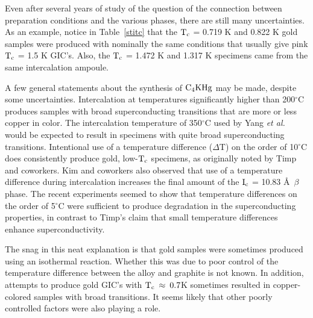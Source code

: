         Even after several years of study of the question of the connection
between preparation conditions and the various phases, there are still many
uncertainties.   As an example,  notice in Table~\ref{stitc}  that the $\rm
T_c$ =  0.719 K and 0.822  K gold samples were  produced with nominally the
same conditions that usually give pink $\rm T_c$ = 1.5  K GIC's.  Also, the
$\rm T_c$ = 1.472 K and 1.317 K specimens came from the  same intercalation
ampoule.

        A few general statements about the synthesis of $\rm C_4KHg$ may be
made,   despite    some   uncertainties.   Intercalation  at   temperatures
significantly  higher  than 200$^{\circ}$C produces   samples  with   broad
superconducting  transitions that are more  or  less copper  in color.  The
intercalation temperature  of    350$^{\circ}$C used   by   Yang  {\em   et
al.\/}\cite{yang88}  would be  expected  to result  in specimens with quite
broad  superconducting   transitions.   Intentional  use of a   temperature
difference  ($\Delta$T)  on the   order of  10$^{\circ}$C does consistently
produce gold,  low-$\rm T_c$  specimens,  as originally noted  by  Timp and
coworkers.\cite{J140,timp83} Kim and coworkers  also observed that use of a
temperature difference  during intercalation increases the  final amount of
the $\rm I_c$ = 10.83 \AA\ $\beta$ phase.\cite{kim84}  The recent
experiments seemed to show that temperature  differences on  the  order of
5$^{\circ}$C were sufficient to produce  degradation in the superconducting
properties, in contrast to Timp's  claim that small temperature differences
enhance superconductivity.\cite{J140}

        The snag  in  this  neat  explanation is   that  gold samples  were
sometimes produced  using an isothermal reaction.  Whether  this was due to
poor control of the temperature  difference  between the alloy and graphite
is not known.  In addition, attempts to produce gold GIC's with $\rm T_c \:
\approx \: 0.7$K sometimes  resulted  in copper-colored  samples with  broad
transitions.  It seems likely that other poorly controlled factors were
also playing a role.

